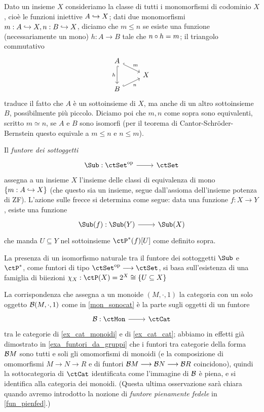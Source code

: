 \begin{definition}\label{def_fun_sub}
	Dato un insieme \(X\) consideriamo la classe di tutti i monomorfismi di codominio \(X\), cioè le funzioni iniettive \(A\hookrightarrow X\); dati due monomorfismi \(m : A\hookrightarrow X, n : B\hookrightarrow X\), diciamo che \(m\le n\) se esiste una funzione (necessariamente un mono) \(h : A\to B\) tale che \(n\circ h = m\); il triangolo commutativo
	\[\begin{tikzcd}[row sep=2mm]
			A \\
			& X \\
			B
			\arrow["m", hook, from=1-1, to=2-2]
			\arrow["h"', hook, from=1-1, to=3-1]
			\arrow["n"', hook, from=3-1, to=2-2]
		\end{tikzcd}\]
	traduce il fatto che \(A\) è un sottoinsieme di \(X\), ma anche di un altro sottoinsieme \(B\), possibilmente più piccolo. Diciamo poi che \(m,n\) come sopra sono equivalenti, scritto \(m\simeq n\), se \(A\) e \(B\) sono isomorfi (per il teorema di Cantor-Schröder-Bernstein questo equivale a \(m\le n\) e \(n\le m\)).

	Il \emph{funtore dei sottoggetti}
	\[\dmFun{\Sub}{\ctSet^\op}{\ctSet}\]
	assegna a un insieme \(X\) l'insieme delle classi di equivalenza di mono \(\{m : A\hookrightarrow X\}\) (che questo sia un insieme, segue dall'assioma dell'insieme potenza di ZF). L'azione sulle frecce si determina come segue: data una funzione \(f : X\to Y\), esiste una funzione
	\[\dmFun{\Sub(f)}{\Sub(Y)}{\Sub(X)}\]
	che manda \(U\subseteq Y\) nel sottoinsieme \(\ctP^*(f)[U]\) come definito sopra.

	La presenza di un isomorfismo naturale tra il funtore dei sottoggetti \(\Sub\) e \(\ctP^*\), come funtori di tipo \(\ctSet^\op\fun\ctSet\), si basa sull'esistenza di una famiglia di biiezioni \(\chi_X : \ctP(X) = \pow X \cong \{U\subseteq X\}\)
\end{definition}
\begin{example}\label{funtore_mon_to_cat}
	La corrispondenza che assegna a un monoide \((M,\cdot,1)\) la categoria con un solo oggetto \(\mathcal{B}(M,\cdot,1)\) come in \ref{mon_sonocat} è la parte sugli oggetti di un funtore
	\[\dmFun{\susp}{\ctMon}{\ctCat}\]
	tra le categorie di \ref{ex_cat_monoidi} e di \ref{ex_cat_cat}; abbiamo in effetti già dimostrato in \ref{exa_funtori_da_gruppi} che i funtori tra categorie della forma \(\mathcal{B} M\) sono tutti e soli gli omomorfismi di monoidi (e la composizione di omomorfismi \(M\to N\to R\) e di funtori \(\mathcal{B} M \longrightarrow\mathcal{B} N \longrightarrow\mathcal{B} R\) coincidono), quindi la sottocategoria di \(\ctCat\) identificata come l'immagine di \(\mathcal{B}\) è piena, e si identifica alla categoria dei monoidi. (Questa ultima osservazione sarà chiara quando avremo introdotto la nozione di \emph{funtore pienamente fedele} in \ref{fun_pienfed}.)
\end{example}
